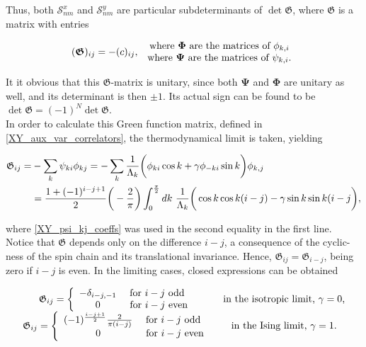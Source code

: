 \documentclass{homework}
\begin{document}
Thus, both $\mathcal{S}_{nm}^x$ and $\mathcal{S}_{nm}^y$
 are particular subdeterminants of $\det \bm{\mathfrak{G}}$, where $\bm{\mathfrak{G}}$ is a matrix with entries 
 
 $$
    (\bm{\mathfrak{G}})_{ij} = - (c)_{ij}, \begin{array}{cc}
         \textnormal{ where $\bm{\Phi}$ are the matrices of ${\phi_{k,i}}$}  \\
         \textnormal{ where $\bm{\Psi}$ are the matrices of ${\psi_{k,i}}$}.
    \end{array}
 $$
 
It it obvious that this $\bm{\mathfrak{G}}$-matrix is unitary, since both $\bm{\Psi}$ and $\bm{\Phi}$ are unitary as well, and its determinant is then $\pm 1$. Its actual sign can be found to be $\det \bm{\mathfrak{G}} = 
(-1)^N \det \bm{\mathfrak{G}}$. \\

In order to calculate this Green function matrix, defined in \cref{XY_aux_var_correlators}, the thermodynamical limit is taken, yielding 

\begin{equation}
    \begin{split}
        \mathfrak{G}_{ij} =& - \sum_{k} \psi_{ki} \phi_{kj} = - \sum_{k} \frac{1}{\Lambda_k} \bigg(\phi_{ki} \cos k + \gamma \phi_{-k i} \sin k\bigg) \phi_{k,j} \\
        &= \frac{1 + (-1)^{i-j+1}}{2} \bigg(-\frac{2}{\pi}\bigg) \int_{0}^{\frac{\pi}{2}} dk \textnormal{ } \frac{1}{\Lambda_k} \bigg(\cos k \cos k(i-j) - \gamma \sin k \sin k(i-j\bigg),
    \end{split}
\end{equation}

where \cref{XY_psi_kj_coeffs} was used in the second equality in the first line. Notice that $\mathfrak{G}$ depends only on the difference $i-j$, a consequence of the cyclic-ness of the spin chain and its translational invariance. Hence, $\mathfrak{G}_{ij} = \mathfrak{G}_{i-j}$, being zero if $i-j$ is even. In the limiting cases, closed expressions can be obtained

\begin{equation}
    \begin{array}{cc}
        \mathfrak{G}_{ij} = \left\{ \begin{array}{cc}
            -\delta_{i-j, -1}  & \textnormal{ for } i-j \textnormal{ odd }\\
             0 & \textnormal{ for } i-j \textnormal{ even}
        \end{array} \right. & \textnormal{ in the isotropic limit, $\gamma = 0$,} \\
        \mathfrak{G}_{ij} = \left\{ \begin{array}{cc}
             (-1)^{\frac{i-j+1}{2}} \frac{2}{\pi (i-j)}   & \textnormal{ for } i-j \textnormal{ odd }\\
             0 & \textnormal{ for } i-j \textnormal{ even}
        \end{array} \right. & \textnormal{ in the Ising limit, $\gamma = 1$.} 
    \end{array}
\end{equation}
\end{document}
